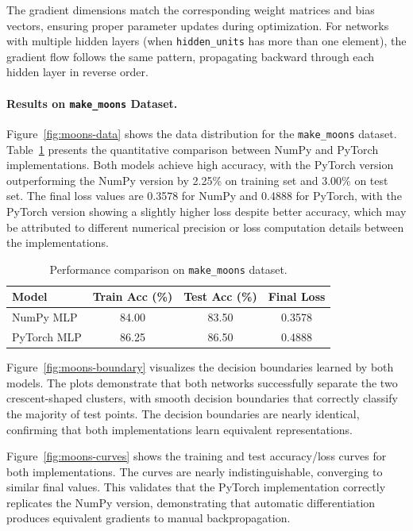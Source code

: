 \documentclass[11pt,a4paper]{article}
\begin{document}
The gradient dimensions match the corresponding weight matrices and bias vectors, ensuring proper parameter updates during optimization. For networks with multiple hidden layers (when \texttt{hidden\_units} has more than one element), the gradient flow follows the same pattern, propagating backward through each hidden layer in reverse order.

\paragraph{Results on \texttt{make\_moons} Dataset.} Figure~\ref{fig:moons-data} shows the data distribution for the \texttt{make\_moons} dataset. Table~\ref{tab:moons-results} presents the quantitative comparison between NumPy and PyTorch implementations. Both models achieve high accuracy, with the PyTorch version outperforming the NumPy version by 2.25\% on training set and 3.00\% on test set. The final loss values are 0.3578 for NumPy and 0.4888 for PyTorch, with the PyTorch version showing a slightly higher loss despite better accuracy, which may be attributed to different numerical precision or loss computation details between the implementations.

\begin{table}[h]
    \centering
    \caption{Performance comparison on \texttt{make\_moons} dataset.}
    \label{tab:moons-results}
    \begin{tabular}{@{}lccc@{}}
        \toprule
        Model & Train Acc (\%) & Test Acc (\%) & Final Loss \\
        \midrule
        NumPy MLP & 84.00 & 83.50 & 0.3578 \\
        PyTorch MLP & 86.25 & 86.50 & 0.4888 \\
        \bottomrule
    \end{tabular}
\end{table}

Figure~\ref{fig:moons-boundary} visualizes the decision boundaries learned by both models. The plots demonstrate that both networks successfully separate the two crescent-shaped clusters, with smooth decision boundaries that correctly classify the majority of test points. The decision boundaries are nearly identical, confirming that both implementations learn equivalent representations.

Figure~\ref{fig:moons-curves} shows the training and test accuracy/loss curves for both implementations. The curves are nearly indistinguishable, converging to similar final values. This validates that the PyTorch implementation correctly replicates the NumPy version, demonstrating that automatic differentiation produces equivalent gradients to manual backpropagation.
\end{document}
